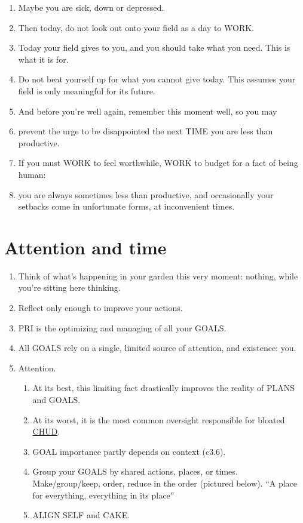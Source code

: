 \documentclass[
]{book}
\providecommand{\tightlist}{%
  \setlength{\itemsep}{0pt}\setlength{\parskip}{0pt}}
\begin{document}
\begin{enumerate}
\def\labelenumi{\arabic{enumi}.}
\setcounter{enumi}{22}
\tightlist
\item
  Maybe you are sick, down or depressed.
\item
  Then today, do not look out onto your field as a day to WORK.
\item
  Today your field gives to you, and you should take what you need. This is what it
  is for.
\item
  Do not beat yourself up for what you cannot give today. This assumes your field
  is only meaningful for its future.
\item
  And before you're well again, remember this moment well, so you may
\item
  prevent the urge to be disappointed the next TIME you are less than productive.
\item
  If you must WORK to feel worthwhile, WORK to budget for a fact of being
  human:
\item
  you are always sometimes less than productive, and occasionally your setbacks
  come in unfortunate forms, at inconvenient times.
\end{enumerate}

\hypertarget{attention-and-time}{%
\section{Attention and time}\label{attention-and-time}}

\begin{enumerate}
\def\labelenumi{\arabic{enumi}.}
\setcounter{enumi}{30}
\item
  Think of what's happening in your garden this very moment: nothing, while
  you're sitting here thinking.
\item
  Reflect only enough to improve your actions.
\item
  PRI is the optimizing and managing of all your GOALS.
\item
  All GOALS rely on a single, limited source of attention, and existence: you.
\item
  Attention.

  \begin{enumerate}
  \def\labelenumii{\arabic{enumii}.}
  \tightlist
  \item
    At its best, this limiting fact drastically improves the reality of PLANS and GOALS.
  \item
    At its worst, it is the most common oversight responsible for bloated \protect\hyperlink{c.h.u.d.}{CHUD}.
  \item
    GOAL importance partly depends on context (c3.6).
  \item
    Group your GOALS by shared actions, places, or times. Make/group/keep,
    order, reduce in the order (pictured below). ``A place for everything,
    everything in its place''
  \item
    ALIGN SELF and CAKE.
  \end{enumerate}
\end{enumerate}
\end{document}
